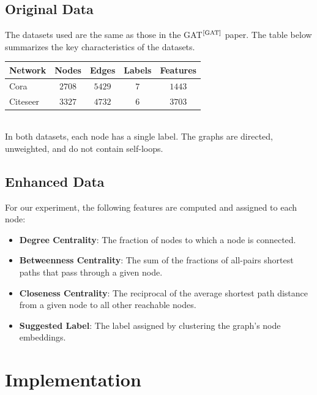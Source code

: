 \documentclass[12pt,conference]{ieeeconf} %
\begin{document}
\subsection{Original Data}
The datasets used are the same as those in the GAT$^\text{\cite{GAT}}$ paper. The table below summarizes the key characteristics of the datasets.
\begin{table}[h!] 
    \centering 
    \renewcommand{\arraystretch}{1.5} 
    \begin{tabular}{|l|c|c|c|c|} 
        \hline 
        \textbf{Network} & \textbf{Nodes} & \textbf{Edges} & \textbf{Labels} & \textbf{Features} \\
        \hline 
        Cora & $2708$ & $5429$ & $7$ & $1443$ \\
        Citeseer & $3327$ & $4732$ & $6$ & $3703$ \\
        \hline 
    \end{tabular} 
\end{table}
\\
In both datasets, each node has a single label. The graphs are directed, unweighted, and do not contain self-loops.

\subsection{Enhanced Data}
For our experiment, the following features are computed and assigned to each node:
\begin{itemize}
    \item \textbf{Degree Centrality}: The fraction of nodes to which a node is connected.
    \item \textbf{Betweenness Centrality}: The sum of the fractions of all-pairs shortest paths that pass through a given node.
    \item \textbf{Closeness Centrality}: The reciprocal of the average shortest path distance from a given node to all other reachable nodes.
    \item \textbf{Suggested Label}: The label assigned by clustering the graph's node embeddings.
\end{itemize}

\section{Implementation} 
\end{document}
